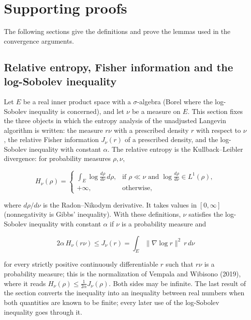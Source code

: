 \documentclass[11pt,a4paper]{report}
\begin{document}
\chapter{Supporting proofs}
The following sections give the definitions and prove the lemmas used in the convergence arguments.

\section{\texorpdfstring{Relative entropy, Fisher information and the log-Sobolev inequality}{Relative entropy, Fisher information and the log-Sobolev inequality}}
\label{proof-module-UnadjustedLangevin-LSI-FunctionalInequality-lean}


Let \(E\) be a real inner product space with a \(\sigma\)-algebra (Borel where the log-Sobolev inequality is concerned), and let \(\nu\) be a measure on \(E\). This section fixes the three objects in which the entropy analysis of the unadjusted Langevin algorithm is written: the measure \(r\nu\) with a prescribed density \(r\) with respect to \(\nu\), the relative Fisher information \(J_\nu(r)\) of a prescribed density, and the log-Sobolev inequality with constant \(\alpha\). The relative entropy is the Kullback–Leibler divergence: for probability measures \(\rho,\nu\),


\[H_\nu(\rho)=\begin{cases}\displaystyle\int_E\log\frac{d\rho}{d\nu}\,d\rho, & \text{if }\rho\ll\nu\text{ and }\log\frac{d\rho}{d\nu}\in L^1(\rho),\\ +\infty, & \text{otherwise},\end{cases}\]


where \(d\rho/d\nu\) is the Radon–Nikodym derivative. It takes values in \([0,\infty]\) (nonnegativity is Gibbs' inequality). With these definitions, \(\nu\) satisfies the log-Sobolev inequality with constant \(\alpha\) if \(\nu\) is a probability measure and


\[2\alpha\,H_\nu(r\nu)\le J_\nu(r)=\int_E\|\nabla\log r\|^2\,r\,d\nu\]


for every strictly positive continuously differentiable \(r\) such that \(r\nu\) is a probability measure; this is the normalization of Vempala and Wibisono (2019), where it reads \(H_\nu(\rho)\le\frac1{2\alpha}J_\nu(\rho)\). Both sides may be infinite. The last result of the section converts the inequality into an inequality between real numbers when both quantities are known to be finite; every later use of the log-Sobolev inequality goes through it.
\end{document}
